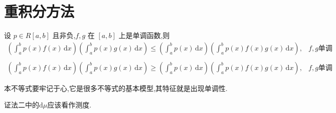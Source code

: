 \documentclass[../../main.tex]{subfiles}
\begin{document}
\section{重积分方法}

\begin{theorem}\label{Chebeshev不等式积分形式}
设 \( p \in R[a,b] \) 且非负,\( f,g \) 在 \([a,b]\) 上是单调函数,则
\begin{align*}
\left( \int_{a}^{b} p(x) f(x) \,\mathrm{d}x \right) \left( \int_{a}^{b} p(x) g(x) \,\mathrm{d}x \right) \leqslant \left( \int_{a}^{b} p(x) \,\mathrm{d}x \right) \left( \int_{a}^{b} p(x) f(x) g(x) \,\mathrm{d}x \right), & f,g\text{单调性相同} \\
\\
\left( \int_{a}^{b} p(x) f(x) \,\mathrm{d}x \right) \left( \int_{a}^{b} p(x) g(x) \,\mathrm{d}x \right) \geqslant \left( \int_{a}^{b} p(x) \,\mathrm{d}x \right) \left( \int_{a}^{b} p(x) f(x) g(x) \,\mathrm{d}x \right), & f,g\text{单调性相反}
\nonumber
\end{align*}
\end{theorem}
\begin{note}
本不等式要牢记于心,它是很多不等式的基本模型,其特征就是出现单调性.
\end{note}
\begin{remark}
{\color{blue}证法二}中的$\mathrm{d}\mu$应该看作测度.
\end{remark}
\end{document}
